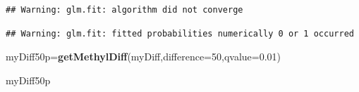 \documentclass[]{article}
\newenvironment{Shaded}{\begin{snugshade}}{\end{snugshade}}
\newcommand{\KeywordTok}[1]{\textcolor[rgb]{0.13,0.29,0.53}{\textbf{#1}}}
\newcommand{\DataTypeTok}[1]{\textcolor[rgb]{0.13,0.29,0.53}{#1}}
\newcommand{\DecValTok}[1]{\textcolor[rgb]{0.00,0.00,0.81}{#1}}
\newcommand{\FloatTok}[1]{\textcolor[rgb]{0.00,0.00,0.81}{#1}}
\newcommand{\NormalTok}[1]{#1}
\begin{document}
\begin{verbatim}
## Warning: glm.fit: algorithm did not converge
\end{verbatim}

\begin{verbatim}
## Warning: glm.fit: fitted probabilities numerically 0 or 1 occurred
\end{verbatim}

\begin{Shaded}
\begin{Highlighting}[]
\NormalTok{myDiff50p=}\KeywordTok{getMethylDiff}\NormalTok{(myDiff,}\DataTypeTok{difference=}\DecValTok{50}\NormalTok{,}\DataTypeTok{qvalue=}\FloatTok{0.01}\NormalTok{)}
\end{Highlighting}
\end{Shaded}

\begin{Shaded}
\begin{Highlighting}[]
\NormalTok{myDiff50p}
\end{Highlighting}
\end{Shaded}
\end{document}
